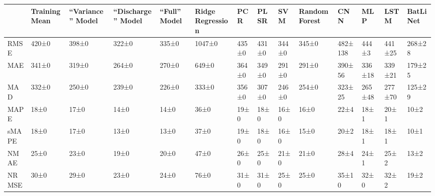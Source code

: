 \begin{tabular}{llllllllllllll}
\toprule
 & Training Mean & ``Variance'' Model & ``Discharge'' Model & ``Full'' Model & Ridge Regression & PCR & PLSR & SVM & Random Forest & CNN & MLP & LSTM & BatLiNet \\
\midrule
RMSE & 420±0 & 398±0 & 322±0 & 335±0 & 1047±0 & 435±0 & 431±0 & 344±0 & 345±0 & 482±138 & 444±3 & 441±25 & 268±28 \\
MAE & 341±0 & 319±0 & 264±0 & 270±0 & 649±0 & 364±0 & 349±0 & 291±0 & 291±0 & 390±56 & 336±18 & 339±21 & 179±25 \\
MAD & 332±0 & 250±0 & 239±0 & 226±0 & 333±0 & 356±0 & 307±0 & 246±0 & 254±0 & 323±25 & 265±48 & 277±70 & 125±29 \\
MAPE & 18±0 & 17±0 & 14±0 & 14±0 & 36±0 & 19±0 & 18±0 & 16±0 & 16±0 & 22±4 & 18±1 & 20±1 & 10±2 \\
sMAPE & 18±0 & 17±0 & 13±0 & 13±0 & 37±0 & 19±0 & 18±0 & 16±0 & 15±0 & 20±2 & 18±1 & 18±1 & 10±1 \\
NMAE & 25±0 & 23±0 & 19±0 & 20±0 & 47±0 & 26±0 & 25±0 & 21±0 & 21±0 & 28±4 & 24±1 & 25±2 & 13±2 \\
NRMSE & 30±0 & 29±0 & 23±0 & 24±0 & 76±0 & 31±0 & 31±0 & 25±0 & 25±0 & 35±10 & 32±0 & 32±2 & 19±2 \\
\bottomrule
\end{tabular}
